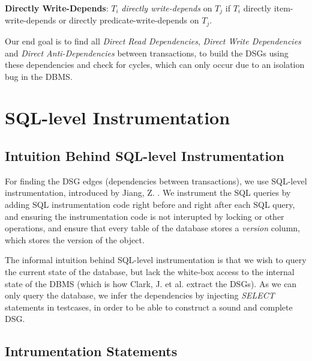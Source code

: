 \begin{definition}
    \textbf{Directly Write-Depends}: $T_i$ \textit{directly write-depends} on $T_j$ if $T_i$ directly item-write-depends or directly predicate-write-depends on $T_j$.
\end{definition}

Our end goal is to find all \textit{Direct Read Dependencies}, \textit{Direct Write Dependencies} and \textit{Direct Anti-Dependencies} between transactions, to build the DSGs using these dependencies and check for cycles, which can only occur due to an isolation bug in the DBMS. 

\section{SQL-level Instrumentation}

\subsection{Intuition Behind SQL-level Instrumentation}

For finding the DSG edges (dependencies between transactions), we use SQL-level instrumentation, introduced by Jiang, Z. \cite{jiang2023detecting}. We instrument the SQL queries by adding SQL instrumentation code right before and right after each SQL query, and ensuring the instrumentation code is not interupted by locking or other operations, and ensure that every table of the database stores a \textit{version} column, which stores the version of the object.

The informal intuition behind SQL-level instrumentation is that we wish to query the current state of the database, but lack the white-box access to the internal state of the DBMS (which is how Clark, J. et al. \cite{clark2024validating} extract the DSGs). As we can only query the database, we infer the dependencies by injecting \textit{SELECT} statements in testcases, in order to be able to construct a sound and complete DSG.

\subsection{Intrumentation Statements}

